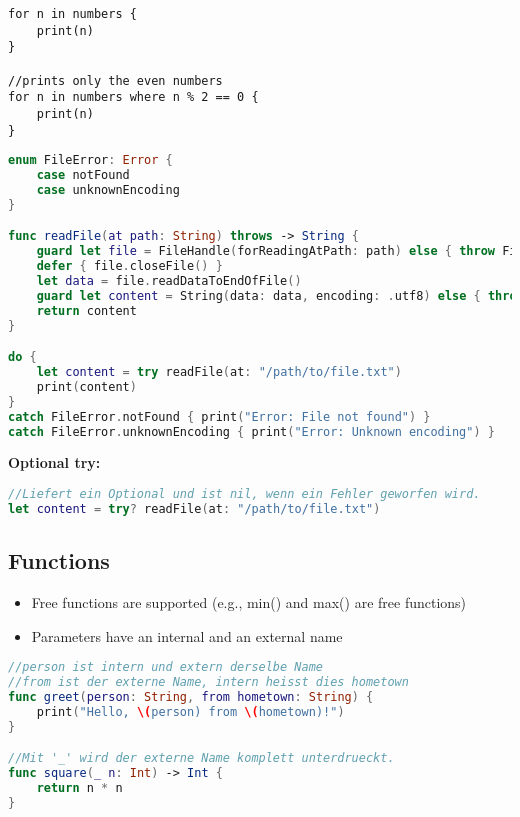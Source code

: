 \begin{breakbox}

\begin{lstlisting}
for n in numbers {
    print(n)
}

//prints only the even numbers
for n in numbers where n % 2 == 0 {
    print(n)
}
\end{lstlisting}
\end{breakbox}

\begin{breakbox}

\begin{lstlisting}[language=swift]
enum FileError: Error {
    case notFound
    case unknownEncoding
}

func readFile(at path: String) throws -> String {
    guard let file = FileHandle(forReadingAtPath: path) else { throw FileError.notFound }
    defer { file.closeFile() }
    let data = file.readDataToEndOfFile()
    guard let content = String(data: data, encoding: .utf8) else { throw FileError.unknownEncoding }
    return content
}

do {
    let content = try readFile(at: "/path/to/file.txt")
    print(content)
}
catch FileError.notFound { print("Error: File not found") }
catch FileError.unknownEncoding { print("Error: Unknown encoding") }
\end{lstlisting}

\textbf{Optional try:}
\begin{lstlisting}[language=swift]
//Liefert ein Optional und ist nil, wenn ein Fehler geworfen wird.
let content = try? readFile(at: "/path/to/file.txt")
\end{lstlisting}
\end{breakbox}

\subsection{Functions}

\begin{breakbox}
\begin{itemize}
\tightlist
\item
  Free functions are supported (e.g., min() and max() are free
  functions)
\item
  Parameters have an internal and an external name
\end{itemize}

\begin{lstlisting}[language=swift]
//person ist intern und extern derselbe Name
//from ist der externe Name, intern heisst dies hometown
func greet(person: String, from hometown: String) {
    print("Hello, \(person) from \(hometown)!")
}

//Mit '_' wird der externe Name komplett unterdrueckt.
func square(_ n: Int) -> Int {
    return n * n
}
\end{lstlisting}
\end{breakbox}

